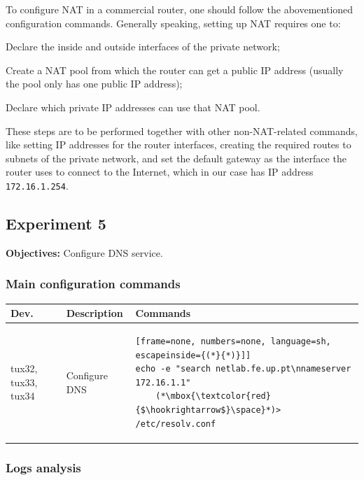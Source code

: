 \documentclass[a4paper, 11pt]{report}
\begin{document}
To configure NAT in a commercial router, one should follow the abovementioned configuration commands. Generally speaking, setting up NAT requires one to:
\begin{enumerate*}
    \item Declare the inside and outside interfaces of the private network;
    \item Create a NAT pool from which the router can get a public IP address (usually the pool only has one public IP address);
    \item Declare which private IP addresses can use that NAT pool.
\end{enumerate*}
These steps are to be performed together with other non-NAT-related commands, like setting IP addresses for the router interfaces, creating the required routes to subnets of the private network, and set the default gateway as the interface the router uses to connect to the Internet, which in our case has IP address \texttt{172.16.1.254}. 

\subsection{Experiment 5} \label{sec:Exp5}

\textbf{Objectives:} Configure DNS service.

\subsubsection{Main configuration commands} \label{sec:Com5}
\begin{center}
    \small
    \begin{tabular}{@{}l | m{29mm} | l@{}}
        {\normalfont\textbf{Dev.}} & {\normalfont\textbf{Description}} & {\normalfont\textbf{Commands}}  \\ \hline
        tux32, tux33, tux34      & Configure DNS & 
        \begin{lstlisting}[frame=none, numbers=none, language=sh, escapeinside={(*}{*)}]]
echo -e "search netlab.fe.up.pt\nnameserver 172.16.1.1"
    (*\mbox{\textcolor{red}{$\hookrightarrow$}\space}*)> /etc/resolv.conf
        \end{lstlisting}
    \end{tabular}
\end{center}
\subsubsection{Logs analysis} \label{sec:Log5}
\end{document}
